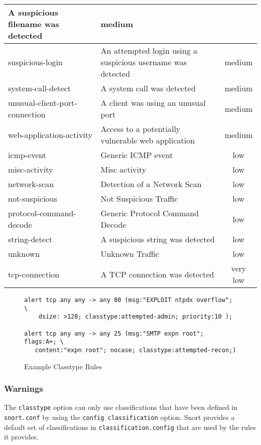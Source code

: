 \documentclass[english]{report}
\begin{document}
\begin{center}
\begin{longtable}{|p{2in}|p{2.5in}|c|}
A suspicious filename was detected & medium\\
\hline 
suspicious-login&
An attempted login using a suspicious username was detected & medium\\
\hline 
system-call-detect&
A system call was detected & medium\\
\hline 
unusual-client-port-connection&
A client was using an unusual port & medium\\
\hline 
web-application-activity&
Access to a potentially vulnerable web application & medium\\
\hline
icmp-event&
Generic ICMP event & low\\
\hline 
misc-activity&
Misc activity & low\\
\hline 
network-scan&
Detection of a Network Scan & low\\
\hline 
not-suspicious&
Not Suspicious Traffic & low\\
\hline 
protocol-command-decode&
Generic Protocol Command Decode & low\\
\hline 
string-detect&
A suspicious string was detected & low\\
\hline 
unknown&
Unknown Traffic & low\\
\hline
tcp-connection&
A TCP connection was detected & very low\\
\hline
\end{longtable}
\end{center}


\begin{figure}[!hbpt]
\begin{verbatim}
alert tcp any any -> any 80 (msg:"EXPLOIT ntpdx overflow"; \ 
    dsize: >128; classtype:attempted-admin; priority:10 );

alert tcp any any -> any 25 (msg:"SMTP expn root"; flags:A+; \
   content:"expn root"; nocase; classtype:attempted-recon;)
\end{verbatim}
\caption{Example Classtype Rules\label{example classification rules}}
\end{figure}

\subsubsection{Warnings}

The \texttt{classtype} option can only use classifications that have been defined in \texttt{snort.conf}
by using the \texttt{config classification} option.  Snort provides a default set of classifications
in \texttt{classification.config} that are used by the rules it provides.
\end{document}

